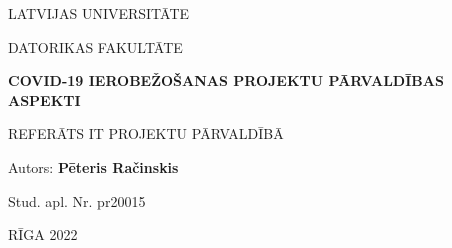\begin{titlepage}
    \begin{center}
        \vspace*{3cm}
        
        LATVIJAS UNIVERSITĀTE

        DATORIKAS FAKULTĀTE

        \vspace*{4cm}

        \large\textbf{COVID-19 IEROBEŽOŠANAS PROJEKTU PĀRVALDĪBAS ASPEKTI}
        
        \vspace{2cm}
        \normalsize{REFERĀTS IT PROJEKTU PĀRVALDĪBĀ}
         
             
    \end{center}
    \vspace{3cm}
    \begin{addmargin}[18em]{0em}
    Autors: \textbf{Pēteris Račinskis}
    \end{addmargin}

    \begin{addmargin}[18em]{0em}
    \hspace{1cm} Stud. apl. Nr. pr20015
    \end{addmargin}

         
    \vfill
    \begin{center}
    RĪGA 2022
    \end{center}
 \end{titlepage}